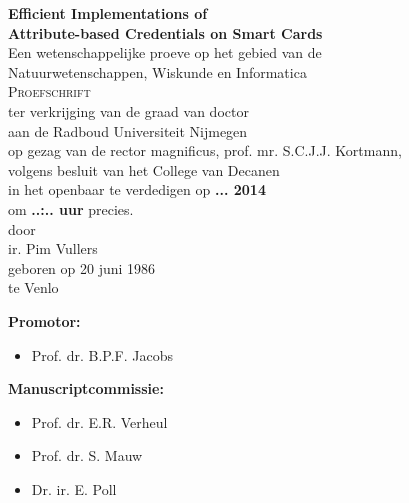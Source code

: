 \thispagestyle{empty}

\begin{center}
  \textbf{\Large Efficient Implementations of\\ Attribute-based Credentials on Smart Cards}\\[15mm]

  Een wetenschappelijke proeve op het gebied van de \\
  Natuurwetenschappen, Wiskunde en Informatica \\[15mm]

  \textsc{Proefschrift} \\[15mm]

  ter verkrijging van de graad van doctor \\
  aan de Radboud Universiteit Nijmegen \\
  op gezag van de rector magnificus, prof. mr. S.C.J.J. Kortmann, \\
  volgens besluit van het College van Decanen \\
  in het openbaar te verdedigen op \textbf{... 2014} \\
  om \textbf{..:.. uur} precies. \\[30mm]

  door \\[30mm]

  ir. Pim Vullers \\[15mm]

  geboren op 20 juni 1986 \\
  te Venlo
\end{center}

\clearpage

\thispagestyle{empty}

\textbf{Promotor:}
\begin{itemize}
  \item[~] Prof. dr. B.P.F. Jacobs
\end{itemize}

\textbf{Manuscriptcommissie:}
\begin{itemize}
  \item[~] Prof. dr. E.R. Verheul
  \item[~] Prof. dr. S. Mauw
  \item[~] Dr. ir. E. Poll
\end{itemize}